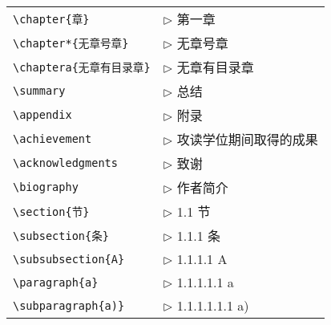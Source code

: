 \begin{tabular}{ll}
  \verb|\chapter{章}|              & $\triangleright$ 第一章 \\
  \verb|\chapter*{无章号章}|       & $\triangleright$ 无章号章 \\
  \verb|\chaptera{无章有目录章}|   & $\triangleright$ 无章有目录章 \\
  \verb|\summary|                  & $\triangleright$ 总结\\
  \verb|\appendix|                 & $\triangleright$ 附录\\
  \verb|\achievement|              & $\triangleright$ 攻读学位期间取得的成果\\
  \verb|\acknowledgments|          & $\triangleright$ 致谢\\
  \verb|\biography|                & $\triangleright$ 作者简介\\
  \verb|\section{节}|              & $\triangleright$ 1.1 节\\
  \verb|\subsection{条}|           & $\triangleright$ 1.1.1 条\\
  \verb|\subsubsection{A}|         & $\triangleright$ 1.1.1.1 A\\
  \verb|\paragraph{a}|             & $\triangleright$ 1.1.1.1.1 a\\
  \verb|\subparagraph{a)}|         & $\triangleright$ 1.1.1.1.1.1 a)\\
\end{tabular}

